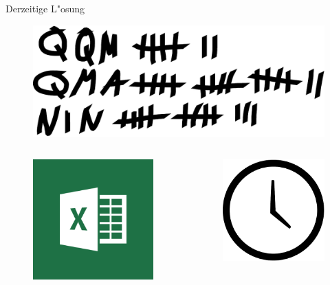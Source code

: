 \begin{frame}{Derzeitige L"osung}
	\begin{figure}[tbh!]
		\includegraphics[width=\textwidth]{Strichliste}
	\end{figure}
	\begin{columns}
		\begin{column}{.5\textwidth}
			\begin{figure}[tbh!]
				\includegraphics[width=.7\textwidth]{Excel}
			\end{figure}
		\end{column}
		\begin{column}{.5\textwidth}
			\begin{figure}[tbh!]
				\includegraphics[width=.7\textwidth]{Uhr}
			\end{figure}
		\end{column}
	\end{columns}
\end{frame}

